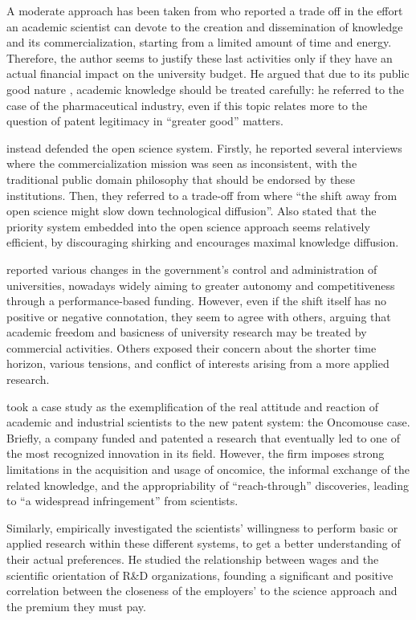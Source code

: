 A moderate approach has been taken from \citet{Beath2000} who reported a trade off in the effort an academic scientist can devote to the creation and dissemination of knowledge and its commercialization, starting from a limited amount of time and energy. Therefore, the author seems to justify these last activities only if they have an actual financial impact on the university budget. He argued that due to its public good nature \citep{Muscio2013}, academic knowledge should be treated carefully: he referred to the case of the pharmaceutical industry, even if this topic relates more to the question of patent legitimacy in \enquote{greater good} matters.

\citet{Siegel2003a} instead defended the open science system. Firstly, he reported several interviews where the commercialization mission was seen as inconsistent, with the traditional public domain philosophy that should be endorsed by these institutions. Then, they referred to a trade-off from \citet{Nelson2001} where \enquote{the shift away from open science might slow down technological diffusion}. Also \citet{Stern2004} stated that the priority system embedded into the open science approach seems relatively efficient, by discouraging shirking and encourages maximal knowledge diffusion.

\citet{Rasmussen2006} reported various changes in the government's control and administration of universities, nowadays widely aiming to greater autonomy and competitiveness through a performance-based funding. However, even if the shift itself has no positive or negative connotation, they seem to agree with others, arguing that academic freedom and basicness of university research may be treated by commercial activities. Others exposed their concern about the shorter time horizon, various tensions, and conflict of interests arising from a more applied research. 

\citet{Murray2005} took a case study as the exemplification of the real attitude and reaction of academic and industrial scientists to the new patent system: the Oncomouse case. Briefly, a company funded and patented a research that eventually led to one of the most recognized innovation in its field. However, the firm imposes strong limitations in the acquisition and usage of oncomice, the informal exchange of the related knowledge, and the appropriability of \enquote{reach-through} discoveries, leading to \enquote{a widespread infringement} from scientists. 

Similarly, \citet{Stern2004} empirically investigated the scientists' willingness to perform basic or applied research within these different systems, to get a better understanding of their actual preferences. He studied the relationship between wages and the scientific orientation of R\&D organizations, founding a significant and positive correlation between the closeness of the employers' to the science approach and the premium they must pay.

